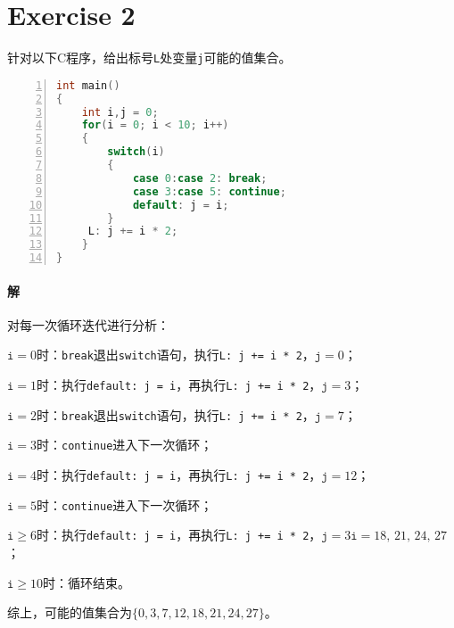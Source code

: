 \documentclass{article}
\begin{document}
\section{Exercise 2}
针对以下C程序，给出标号\texttt{L}处变量\texttt{j}可能的值集合。
\begin{lstlisting}[language = C++, 
         numbers=left, 
         numberstyle=\tiny,
         keywordstyle=\bfseries\color{blue!70},
         commentstyle=\color{red!40!green!60!blue},
         frame=shadowbox,
         rulesepcolor=\color{red!20!green!30!blue!20},
         basicstyle=\ttfamily]
int main()
{
    int i,j = 0;
    for(i = 0; i < 10; i++)
    {
        switch(i)
        {
            case 0:case 2: break;
            case 3:case 5: continue;
            default: j = i;  
        }
     L: j += i * 2;
    }
}
\end{lstlisting}

\paragraph{解}
对每一次循环迭代进行分析：\par
$\texttt{i}=0$时：\texttt{break}退出\texttt{switch}语句，执行\texttt{L: j += i * 2}，$\texttt{j}=0$； \par
$\texttt{i}=1$时：执行\texttt{default: j = i}，再执行\texttt{L: j += i * 2}，$\texttt{j}=3$； \par
$\texttt{i}=2$时：\texttt{break}退出\texttt{switch}语句，执行\texttt{L: j += i * 2}，$\texttt{j}=7$； \par
$\texttt{i}=3$时：\texttt{continue}进入下一次循环； \par
$\texttt{i}=4$时：执行\texttt{default: j = i}，再执行\texttt{L: j += i * 2}，$\texttt{j}=12$； \par
$\texttt{i}=5$时：\texttt{continue}进入下一次循环； \par
$\texttt{i} \geq 6$时：执行\texttt{default: j = i}，再执行\texttt{L: j += i * 2}，$\texttt{j}=3\texttt{i}=18,\,21,\,24,\,27$； \par
$\texttt{i} \geq 10$时：循环结束。 \par
综上，可能的值集合为$\{0,3,7,12,18,21,24,27\}$。
\\
\end{document}
